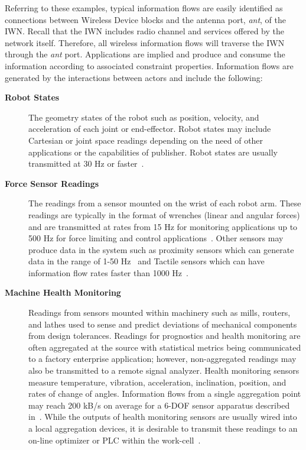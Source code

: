 Referring to these examples, typical information flows are easily identified as connections between Wireless Device blocks and the antenna port, \textit{ant}, of the IWN.  Recall that the IWN includes radio channel and services offered by the network itself.  Therefore, all wireless information flows will traverse the IWN through the \textit{ant} port.  Applications are implied and produce and consume the information according to associated constraint properties.  Information flows are generated by the interactions between actors and include the following:  

\begin{description}
	
	\item[\textbf{Robot States}] The geometry states of the robot such as position, velocity, and acceleration of each joint or end-effector. Robot states may include Cartesian or joint space readings depending on the need of other applications or the capabilities of publisher.  Robot states are usually transmitted at 30 Hz or faster~\cite{JMarvel2017}.
	
	\item[\textbf{Force Sensor Readings}] The readings from a sensor mounted on the wrist of each robot arm. These readings are typically in the format of wrenches (linear and angular forces) and are transmitted at rates from 15 Hz for monitoring applications up to 500 Hz for force limiting and control applications~\cite{onrobot}. Other sensors may produce data in the system such as proximity sensors which can generate data in the range of 1-50 Hz~\cite{DiffuseSensorSpecs} and Tactile sensors which can have information flow rates faster than 1000 Hz~\cite{TactileInternet}.
	
	\item[\textbf{Machine Health Monitoring}] Readings from sensors mounted within machinery such as mills, routers, and lathes used to sense and predict deviations of mechanical components from design tolerances. Readings for prognostics and health monitoring are often aggregated at the source with statistical metrics being communicated to a factory enterprise application; however, non-aggregated readings may also be transmitted to a remote signal analyzer.  Health monitoring sensors measure temperature, vibration, acceleration, inclination, position, and rates of change of angles. Information flows from a single aggregation point may reach 200 kB/s on average for a 6-DOF sensor apparatus described in~\cite{ELWeiss}. While the outputs of health monitoring sensors are usually wired into a local aggregation devices, it is desirable to transmit these readings to an on-line optimizer or PLC within the work-cell~\cite{Weiss2016.PHM}.
	

\end{description}
